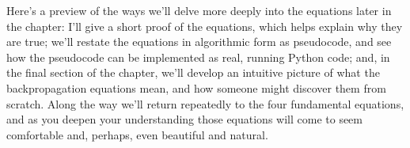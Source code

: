 \documentclass[a4paper,twoside,10pt]{book}
\begin{document}
Here's a preview of the ways we'll delve more deeply into the equations later in the chapter: I'll give a short proof of the equations, which helps explain why they are true; we'll restate the equations in algorithmic form as pseudocode, and see how the pseudocode can be implemented as real, running Python code; and, in the final section of the chapter, we'll develop an intuitive picture of what the backpropagation equations mean, and how someone might discover them from scratch. Along the way we'll return repeatedly to the four fundamental equations, and as you deepen your understanding those equations will come to seem comfortable and, perhaps, even beautiful and natural.
%
%
%
\end{document}

